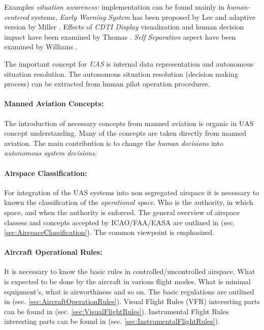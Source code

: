 Examples \emph{situation awareness:} implementation can be found mainly in \emph{human-centered} systems, \emph{Early Warning System} has been proposed by Lee \cite{lee2002collision} and adaptive version by Miller \cite{miller2002adaptive}. Effects of \emph{CDTI Display} visualization and human decision impact have been examined by Thomas \cite{thomas2005effects}. \emph{Self Separation} aspect have been examined by Williams \cite{williams1983self}.

\noindent
The important concept for \emph{UAS} is internal data representation and autonomous situation resolution. The autonomous situation resolution (decision making process) can be extracted from human pilot operation procedures.  

\paragraph{Manned Aviation Concepts:} The introduction of necessary concepts from manned aviation is organic in UAS concept understanding. 
Many of the concepts are taken directly from manned aviation. The main contribution is to change the \emph{human decisions} into \emph{autonomous system decisions}.

\paragraph{Airspace Classification:} For integration of the UAS systems into non segregated airspace it is necessary to known the classification of the \emph{operational space}. Who is the authority, in which space, and when the authority is enforced. The general overview of airspace classess and concepts accepted by ICAO/FAA/EASA are outlined in (sec. \ref{sec:AirspaceClassification}). The common viewpoint is emphasized. 
    
\paragraph{Aircraft Operational Rules:} It is necessary to know the basic rules in controlled/uncontrolled airspace. What is expected to be done by the aircraft in various flight modes. What is minimal equipment's, what is airworthiness and so on. The basic regulations are outlined in (sec. \ref{sec:AircraftOperationRules}). Visual Flight Rules (VFR) interesting parts can be found in (sec. \ref{sec:VisualFlightRules}). Instrumental Flight Rules interesting parts can be found in (sec. \ref{sec:InstrumentalFlightRules}).
        
